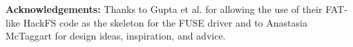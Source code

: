 \documentclass{article}
\begin{document}
\begin{multicols}{2}
\textbf{Acknowledgements:} Thanks to Gupta et al. for allowing the use of their FAT-like HackFS code as the skeleton for the FUSE driver and to Anastasia McTaggart for design ideas, inspiration, and advice.




\end{multicols}
\end{document}
